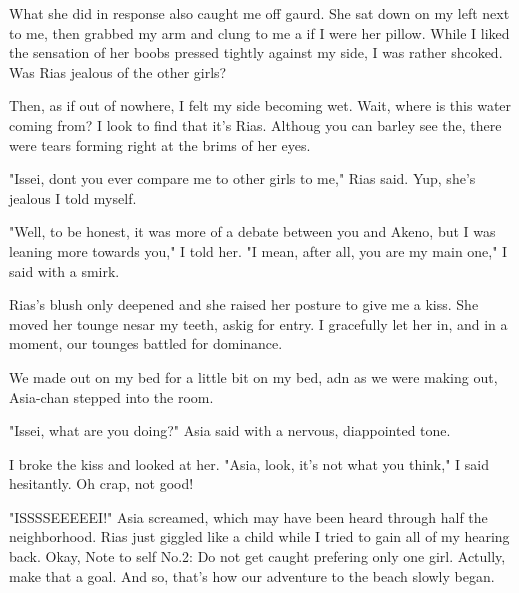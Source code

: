 \documentclass{article}
\begin{document}
What she did in response also caught me off gaurd. She sat down on my left next to me, then grabbed my arm and clung to me a if I were her pillow. While I liked the sensation of her boobs pressed tightly against my side, I was rather shcoked. Was Rias jealous of the other girls?

Then, as if out of nowhere, I felt my side becoming wet. Wait, where is this water coming from? I look to find that it's Rias. Althoug you can barley see the, there were tears forming right at the brims of her eyes.

"Issei, dont you ever compare me to other girls to me," Rias said. Yup, she's jealous I told myself.

"Well, to be honest, it was more of a debate between you and Akeno, but I was leaning more towards you," I told her. "I mean, after all, you are my main one," I said with a smirk.

Rias's blush only deepened and she raised her posture to give me a kiss. She moved her tounge nesar my teeth, askig for entry. I gracefully let her in, and in a moment, our tounges battled for dominance.

We made out on my bed for a little bit on my bed, adn as we were making out, Asia-chan stepped into the room.

"Issei, what are you doing?" Asia said with a nervous, diappointed tone.

I broke the kiss and looked at her. "Asia, look, it's not what you think," I said hesitantly. Oh crap, not good!

"ISSSSEEEEEI!" Asia screamed, which may have been heard through half the neighborhood. Rias just giggled like a child while I tried to gain all of my hearing back. Okay, Note to self No.2: Do not get caught prefering only one girl. Actully, make that a goal. And so, that's how our adventure to the beach slowly began.
\end{document}
